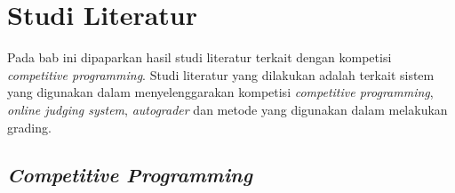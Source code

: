 \chapter{Studi Literatur}

\par Pada bab ini dipaparkan hasil studi literatur terkait dengan kompetisi \textit{competitive programming}. Studi literatur yang dilakukan adalah terkait sistem yang digunakan dalam menyelenggarakan kompetisi \textit{competitive programming}, \textit{online judging system}, \textit{autograder} dan metode yang digunakan dalam melakukan grading.

\section{\textit{Competitive Programming}}

